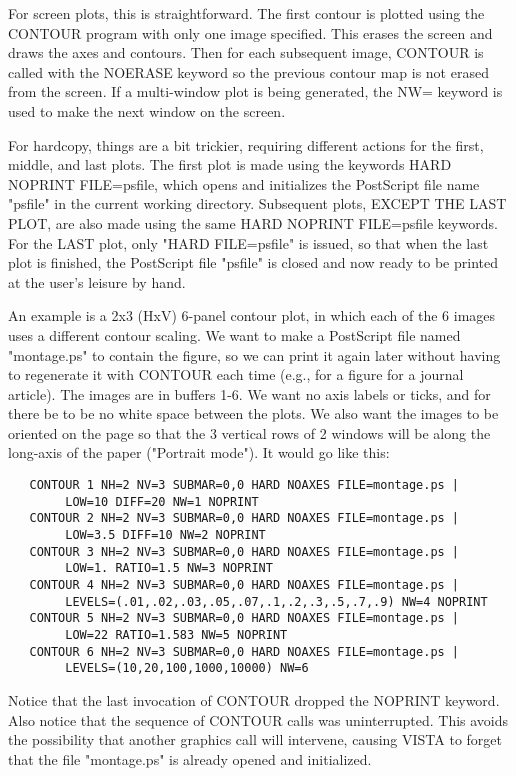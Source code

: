 For screen plots, this is straightforward.  The first contour is plotted
using the CONTOUR program with only one image specified.  This erases the
screen and draws the axes and contours.  Then for each subsequent image,
CONTOUR is called with the NOERASE keyword so the previous contour map is
not erased from the screen.  If a multi-window plot is being generated, the
NW= keyword is used to make the next window on the screen.
 
For hardcopy, things are a bit trickier, requiring different actions for
the first, middle, and last plots.  The first plot is made using the
keywords HARD NOPRINT FILE=psfile, which opens and initializes the
PostScript file name "psfile" in the current working directory.  Subsequent
plots, EXCEPT THE LAST PLOT, are also made using the same HARD NOPRINT
FILE=psfile keywords.  For the LAST plot, only "HARD FILE=psfile" is
issued, so that when the last plot is finished, the PostScript file
"psfile" is closed and now ready to be printed at the user's leisure by
hand.
 
An example is a 2x3 (HxV) 6-panel contour plot, in which each of the 6
images uses a different contour scaling.  We want to make a PostScript file
named "montage.ps" to contain the figure, so we can print it again later
without having to regenerate it with CONTOUR each time (e.g., for a figure
for a journal article).  The images are in buffers 1-6.  We want no axis
labels or ticks, and for there be to be no white space between the plots.
We also want the images to be oriented on the page so that the 3 vertical
rows of 2 windows will be along the long-axis of the paper ("Portrait
mode").  It would go like this:

\begin{verbatim} 
   CONTOUR 1 NH=2 NV=3 SUBMAR=0,0 HARD NOAXES FILE=montage.ps |
        LOW=10 DIFF=20 NW=1 NOPRINT
   CONTOUR 2 NH=2 NV=3 SUBMAR=0,0 HARD NOAXES FILE=montage.ps |
        LOW=3.5 DIFF=10 NW=2 NOPRINT
   CONTOUR 3 NH=2 NV=3 SUBMAR=0,0 HARD NOAXES FILE=montage.ps |
        LOW=1. RATIO=1.5 NW=3 NOPRINT
   CONTOUR 4 NH=2 NV=3 SUBMAR=0,0 HARD NOAXES FILE=montage.ps |
        LEVELS=(.01,.02,.03,.05,.07,.1,.2,.3,.5,.7,.9) NW=4 NOPRINT
   CONTOUR 5 NH=2 NV=3 SUBMAR=0,0 HARD NOAXES FILE=montage.ps |
        LOW=22 RATIO=1.583 NW=5 NOPRINT
   CONTOUR 6 NH=2 NV=3 SUBMAR=0,0 HARD NOAXES FILE=montage.ps |
        LEVELS=(10,20,100,1000,10000) NW=6
\end{verbatim} 
Notice that the last invocation of CONTOUR dropped the NOPRINT keyword.
Also notice that the sequence of CONTOUR calls was uninterrupted.  This
avoids the possibility that another graphics call will intervene, causing
VISTA to forget that the file "montage.ps" is already opened and
initialized.
 

